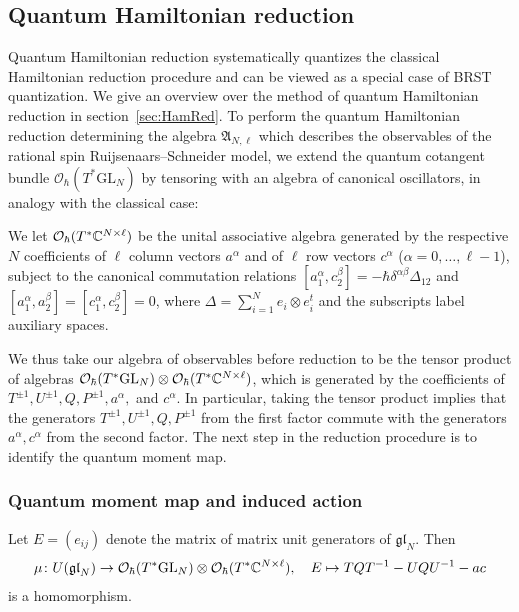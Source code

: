 \subsection{Quantum Hamiltonian reduction} \label{subsection:quantumHamiltonianReduction}

Quantum Hamiltonian reduction systematically quantizes the classical Hamiltonian reduction procedure and can be viewed as a special case of BRST quantization. We give an overview over the method of quantum Hamiltonian reduction in section~\ref{sec:HamRed}. To perform the quantum Hamiltonian reduction determining the algebra $\mathfrak{A}_{N,\ell}$ which describes the observables of the rational spin Ruijsenaars--Schneider model, we extend the quantum cotangent bundle $\mathcal{O}_\hbar(T^* \mathrm{GL}_N)$ by tensoring with an algebra of canonical oscillators, in analogy with the classical case:

\begin{definition}
We let $\mathcal{O}_\hbar(T^* \mathbb{C}^{N \times \ell})$ be the unital associative algebra generated by the respective $N$ coefficients of $\ell$ column vectors $a^\alpha$ and of $\ell$ row vectors $c^\alpha$ ($\alpha=0,\dots,\ell-1$), subject to the canonical commutation relations $[a_1^\alpha,c_2^\beta] = -\hbar\delta^{\alpha\beta} \Delta_{12}$ and $[a_1^\alpha,a_2^\beta] = [c_1^\alpha,c_2^\beta] = 0$, where $\Delta = \sum_{i=1}^N e_i \otimes e_i^t$ and the subscripts label auxiliary spaces.
\end{definition}

We thus take our algebra of observables before reduction to be the tensor product of algebras $\mathcal{O}_\hbar(T^* \mathrm{GL}_N) \otimes \mathcal{O}_\hbar(T^* \mathbb{C}^{N \times \ell})$, which is generated by the coefficients of $T^{\pm 1},U^{\pm 1},Q,P^{\pm 1},a^\alpha,$ and $c^\alpha$. In particular, taking the tensor product implies that the generators $T^{\pm 1},U^{\pm 1},Q,P^{\pm 1}$ from the first factor commute with the generators $a^\alpha,c^\alpha$ from the second factor.  The next step in the reduction procedure is to identify the quantum moment map.

\subsubsection{Quantum moment map and induced action}

\begin{prop}
Let $E = (e_{ij})$ denote the matrix of matrix unit generators of $\mathfrak{gl}_N$. Then
\begin{align}
\mu \colon U(\mathfrak{gl}_N) \to \mathcal{O}_\hbar(T^* \mathrm{GL}_N) \otimes \mathcal{O}_\hbar(T^* \mathbb{C}^{N \times \ell}), \quad E \mapsto TQT^{-1} - UQU^{-1} - ac
\end{align}
is a homomorphism.
\end{prop}

